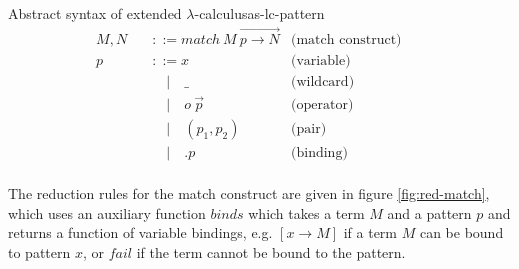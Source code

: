 \begin{myfigure}{Abstract syntax of extended $\lambda$-calculus}{as-lc-pattern}
    \[
        \begin{aligned}
            M,N \quad & ::= match \ M \ \overrightarrow{p \rightarrow N} & \text{(match construct)} &  & \\
            p \quad   & ::= x                                            & \text{(variable)}        &  & \\
                      & \quad | \quad \_                                 & \text{(wildcard)}        &  & \\
                      & \quad | \quad o \ \Vec{p}                        & \text{(operator)}        &  & \\
                      & \quad | \quad (p_1,p_2)                          & \text{(pair)}            &  & \\
                      & \quad | \quad .p                                 & \text{(binding)}         &  & \\
        \end{aligned}
    \]
\end{myfigure}

The reduction rules for the match construct are given in figure \ref{fig:red-match}, which uses an auxiliary function $binds$ which takes a term $M$ and a pattern $p$ and returns a function of variable bindings, e.g. $[x \rightarrow M]$ if a term $M$ can be bound to pattern $x$, or $fail$ if the term cannot be bound to the pattern.

